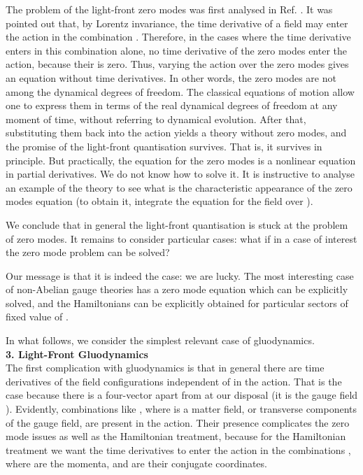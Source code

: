 \documentclass[a4paper,12pt]{article}
\begin{document}
The problem of the light-front zero modes was first analysed in 
Ref. \cite{Maskawa}.
It was pointed out that, by Lorentz invariance, 
the time derivative of a field \coordHE{} 
may enter the action in the combination \coordHE{}. 
Therefore, in the cases where the time derivative enters in this combination alone,
no time derivative of the zero modes enter the action, 
because their \myHighlight{$\partial_-$}\coordHE{} is zero.
Thus, varying the action over the zero modes gives an equation without time 
derivatives. In other words, the zero modes are not among the dynamical 
degrees of freedom.
The classical equations of motion allow 
one to express
them in terms of the real dynamical
degrees of freedom at any moment of time, without referring 
to dynamical evolution. 
After that, substituting them back into the action yields 
a theory without zero 
modes, and the promise of the light-front quantisation survives. 
That is, it survives in principle. But practically, the equation 
for the zero modes is a nonlinear equation in partial derivatives. 
We do not know how to solve it. It is instructive to 
analyse an example of the \coordHE{} theory to see what is the characteristic 
appearance of the zero modes equation (to obtain it, integrate the equation 
for the field over \coordHE{}).

We conclude that in general the light-front quantisation is stuck at 
the problem of zero modes. It remains to consider particular cases: 
what if in a case of interest the 
zero mode problem can be solved?

Our message is that it is indeed the case: we are lucky. 
The most interesting case 
of non-Abelian gauge theories has a zero mode equation 
which can be explicitly solved, and the Hamiltonians can be 
explicitly obtained for particular sectors of 
fixed value of \coordHE{}.

In what follows, we consider the simplest relevant case of \coordHE{} 
gluodynamics.\\

{\bf 3. Light-Front Gluodynamics }\\

The first complication with gluodynamics is that in general there are time 
derivatives of the field configurations independent of \coordHE{} in the action. 
That is the case because there is a four-vector apart from 
\myHighlight{$\partial_\mu$}\coordHE{} at our disposal 
(it is the gauge field \coordHE{}).
Evidently, combinations like \coordHE{}, where 
\myHighlight{$\phi$}\coordHE{} is a matter 
field, or transverse components of the gauge field, are present in the action.
Their presence complicates
the zero mode issues as well as the Hamiltonian treatment, 
because for the Hamiltonian treatment 
we want the time derivatives to enter the action in the combinations 
\coordHE{}, where \coordHE{} are the momenta, and \coordHE{} are their conjugate 
coordinates.
\end{document}

